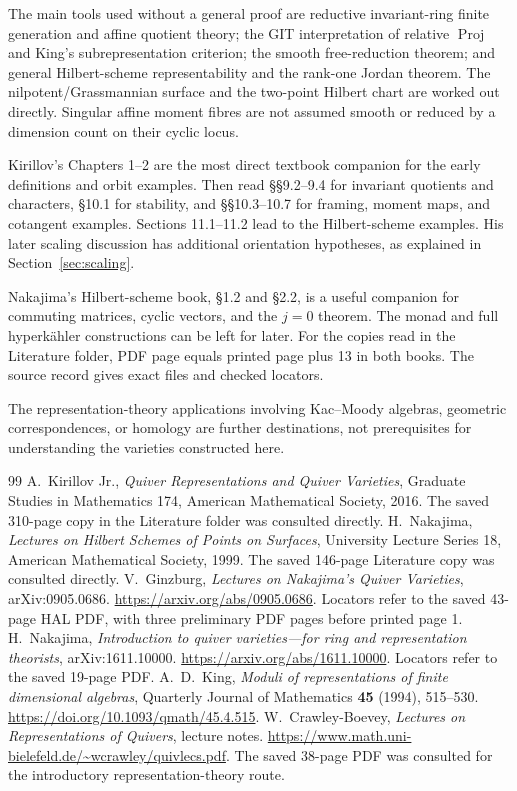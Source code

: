 \documentclass[11pt,a4paper]{article}
\numberwithin{equation}{section}
\theoremstyle{definition}
\newcommand{\Proj}{\operatorname{Proj}}
\begin{document}
The main tools used without a general proof are reductive
invariant-ring finite generation and affine quotient theory;
the GIT interpretation of relative $\Proj$ and King's
subrepresentation criterion; the smooth free-reduction
theorem; and general Hilbert-scheme representability and
the rank-one Jordan theorem. The nilpotent/Grassmannian
surface and the two-point Hilbert chart are worked out
directly. Singular affine moment fibres are not assumed
smooth or reduced by a dimension count on their cyclic locus.

Kirillov's Chapters 1--2 are the most direct textbook
companion for the early definitions and orbit examples.
Then read \S\S9.2--9.4 for invariant quotients and
characters, \S10.1 for stability, and \S\S10.3--10.7
for framing, moment maps, and cotangent examples.
Sections 11.1--11.2 lead to the Hilbert-scheme examples.
His later scaling discussion has additional orientation
hypotheses, as explained in Section~\ref{sec:scaling}.

Nakajima's Hilbert-scheme book, \S1.2 and \S2.2,
is a useful companion for commuting matrices, cyclic
vectors, and the $j=0$ theorem. The monad and full
hyperkähler constructions can be left for later.
For the copies read in the Literature folder, PDF page
equals printed page plus 13 in both books. The source
record gives exact files and checked locators.

The representation-theory applications involving
Kac--Moody algebras, geometric correspondences, or
homology are further destinations, not prerequisites
for understanding the varieties constructed here.

\begin{thebibliography}{99}
 A.~Kirillov Jr., \emph{Quiver Representations
and Quiver Varieties}, Graduate Studies in Mathematics 174,
American Mathematical Society, 2016. The saved 310-page
copy in the Literature folder was consulted directly.
 H.~Nakajima, \emph{Lectures on Hilbert
Schemes of Points on Surfaces}, University Lecture Series 18,
American Mathematical Society, 1999. The saved 146-page
Literature copy was consulted directly.
 V.~Ginzburg, \emph{Lectures on Nakajima's
Quiver Varieties}, arXiv:0905.0686.
\url{https://arxiv.org/abs/0905.0686}.
Locators refer to the saved 43-page HAL PDF, with three
preliminary PDF pages before printed page 1.
 H.~Nakajima, \emph{Introduction to quiver
varieties---for ring and representation theorists},
arXiv:1611.10000.
\url{https://arxiv.org/abs/1611.10000}.
Locators refer to the saved 19-page PDF.
 A.~D.~King, \emph{Moduli of representations
of finite dimensional algebras}, Quarterly Journal of
Mathematics \textbf{45} (1994), 515--530.
\url{https://doi.org/10.1093/qmath/45.4.515}.
 W.~Crawley-Boevey, \emph{Lectures on
Representations of Quivers}, lecture notes.
\url{https://www.math.uni-bielefeld.de/~wcrawley/quivlecs.pdf}.
The saved 38-page PDF was consulted for the introductory
representation-theory route.
\end{thebibliography}
\end{document}
